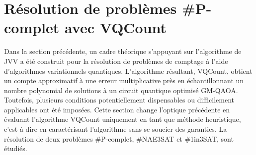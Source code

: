 \chapter{Résolution de problèmes \textsf{\#P}-complet avec VQCount}

Dans la section précédente, un cadre théorique s'appuyant sur l'algorithme de JVV a été construit pour la résolution de problèmes de comptage à l'aide d'algorithmes variationnels quantiques. L'algorithme résultant, VQCount, obtient un compte approximatif à une erreur multiplicative près en échantillonnant un nombre polynomial de solutions à un circuit quantique optimisé GM-QAOA. Toutefois, plusieurs conditions potentiellement dispensables ou difficilement applicables ont été imposées. Cette section change l'optique précédente en évaluant l'algorithme VQCount uniquement en tant que méthode heuristique, c'est-à-dire en caractérisant l'algorithme sans se soucier des garanties. La résolution de deux problèmes \textsf{\#P}-complet, \#NAE3SAT et \#1in3SAT, sont étudiés.

